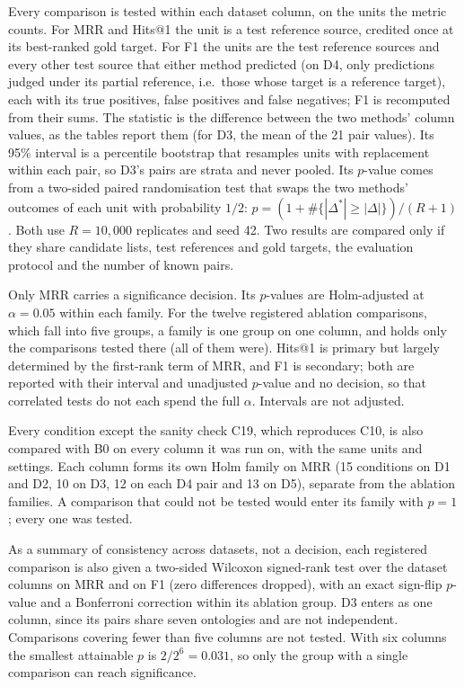 Every comparison is tested within each dataset column, on the units the
metric counts. For MRR and Hits@1 the unit is a test reference source,
credited once at its best-ranked gold target. For F1 the units are the test
reference sources and every other test source that either method predicted
(on D4, only predictions judged under its partial reference, i.e.\ those
whose target is a reference target), each with its true positives, false
positives and false negatives; F1 is recomputed from their sums. The statistic is the difference between the two
methods' column values, as the tables report them (for D3, the mean of the
21 pair values). Its 95\% interval is a percentile bootstrap that resamples
units with replacement within each pair, so D3's pairs are strata and never
pooled. Its $p$-value comes from a two-sided paired randomisation test that
swaps the two methods' outcomes of each unit with probability $1/2$:
$p = (1 + \#\{|\Delta^*| \geq |\Delta|\})/(R + 1)$. Both use $R = 10{,}000$
replicates and seed 42. Two results are compared only if they share candidate
lists, test references and gold targets, the evaluation protocol and the
number of known pairs.

Only MRR carries a significance decision. Its $p$-values are Holm-adjusted at
$\alpha = 0.05$ within each family. For the twelve registered ablation
comparisons, which fall into five groups, a family is one group on one
column, and holds only the comparisons tested there (all of them were). Hits@1 is primary but largely determined by the first-rank term of
MRR, and F1 is secondary; both are reported with their interval and
unadjusted $p$-value and no decision, so that correlated tests do not each
spend the full $\alpha$. Intervals are not adjusted.

Every condition except the sanity check C19, which reproduces C10, is also
compared with B0 on every column it was run on, with the same units and
settings. Each column forms its own Holm family on
MRR (15 conditions on D1 and D2, 10 on D3, 12 on each D4 pair and 13 on
D5), separate from the ablation families. A comparison that could not be
tested would enter its family with $p = 1$; every one was tested.

As a summary of consistency across datasets, not a decision, each registered
comparison is also given a two-sided Wilcoxon signed-rank test over the dataset
columns on MRR and on F1 (zero differences dropped), with an exact sign-flip
$p$-value and a Bonferroni
correction within its ablation group. D3 enters as one column, since its
pairs share seven ontologies and are not independent. Comparisons covering
fewer than five columns are not tested. With six columns the smallest
attainable $p$ is $2/2^6 = 0.031$, so only the group with a single comparison
can reach significance.

